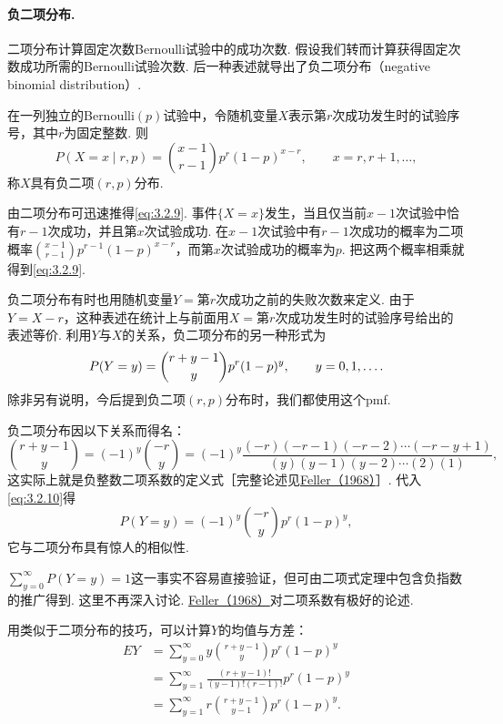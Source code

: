 \paragraph{负二项分布.}
二项分布计算固定次数Bernoulli试验中的成功次数. 假设我们转而计算获得固定次数成功所需的Bernoulli试验次数. 后一种表述就导出了负二项分布（negative binomial distribution）.

在一列独立的Bernoulli$(p)$试验中，令随机变量$X$表示第$r$次成功发生时的试验序号，其中$r$为固定整数. 则
\begin{equation}\label{eq:3.2.9}
P(X=x\mid r,p)=\binom{x-1}{r-1}p^r(1-p)^{x-r},\qquad x=r,r+1,\ldots,
\end{equation}
称$X$具有负二项$(r,p)$分布.

由二项分布可迅速推得\eqref{eq:3.2.9}. 事件$\{X=x\}$发生，当且仅当前$x-1$次试验中恰有$r-1$次成功，并且第$x$次试验成功. 在$x-1$次试验中有$r-1$次成功的概率为二项概率$\binom{x-1}{r-1}p^{r-1}(1-p)^{x-r}$，而第$x$次试验成功的概率为$p$. 把这两个概率相乘就得到\eqref{eq:3.2.9}.

负二项分布有时也用随机变量$Y=$第$r$次成功之前的失败次数来定义. 由于$Y=X-r$，这种表述在统计上与前面用$X=$第$r$次成功发生时的试验序号给出的表述等价. 利用$Y$与$X$的关系，负二项分布的另一种形式为
\begin{equation}\label{eq:3.2.10}\index{SI0351@负二项}
P(Y=y)=\binom{r+y-1}{y}p^r(1-p)^y,\qquad y=0,1,\ldots.
\end{equation}
除非另有说明，今后提到负二项$(r,p)$分布时，我们都使用这个pmf.

负二项分布因以下关系而得名：
$$\binom{r+y-1}{y}=(-1)^y\binom{-r}{y}=(-1)^y\frac{(-r)(-r-1)(-r-2)\cdots(-r-y+1)}{(y)(y-1)(y-2)\cdots(2)(1)},$$
这实际上就是负整数二项系数的定义式［完整论述见\hyperref[bib:source118]{Feller（1968）}］. 代入\eqref{eq:3.2.10}得
$$P(Y=y)=(-1)^y\binom{-r}{y}p^r(1-p)^y,$$
它与二项分布具有惊人的相似性.

$\sum_{y=0}^\infty P(Y=y)=1$这一事实不容易直接验证，但可由二项式定理中包含负指数的推广得到. 这里不再深入讨论. \hyperref[bib:source118]{Feller（1968）}对二项系数有极好的论述.

用类似于二项分布的技巧，可以计算$Y$的均值与方差：
\begin{align*}
EY&=\sum_{y=0}^\infty y\binom{r+y-1}{y}p^r(1-p)^y\\
&=\sum_{y=1}^\infty\frac{(r+y-1)!}{(y-1)!(r-1)!}p^r(1-p)^y\\
&=\sum_{y=1}^\infty r\binom{r+y-1}{y-1}p^r(1-p)^y.
\end{align*}

